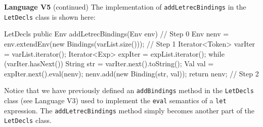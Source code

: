 \begin{minipage}[t]{\sw}
\slidenumber
\LARGE
{\bf Language V5} (continued)\exx
The implementation of \verb'addLetrecBindings'
in the \verb'LetDecls' class is shown here:
{\Large
\begin{qv}
LetDecls
    public Env addLetrecBindings(Env env) {
        // Step 0
        Env nenv = env.extendEnv(new Bindings(varList.size()));
        // Step 1
        Iterator<Token> varIter = varList.iterator();
        Iterator<Exp> expIter = expList.iterator();
        while (varIter.hasNext()) {
            String str = varIter.next().toString();
            Val val = expIter.next().eval(nenv);
            nenv.add(new Binding(str, val));
        }
        return nenv; // Step 2
    }
\end{qv}
}
Notice that we have previously defined an \verb'addBindings' method
in the \verb'LetDecls' class (see Language V3)
used to implement the \verb'eval' semantics of a \verb'let' expression.
The \verb'addLetrecBindings' method simply becomes another part
of the \verb'LetDecls' class.
\end{minipage}
\clearpage
